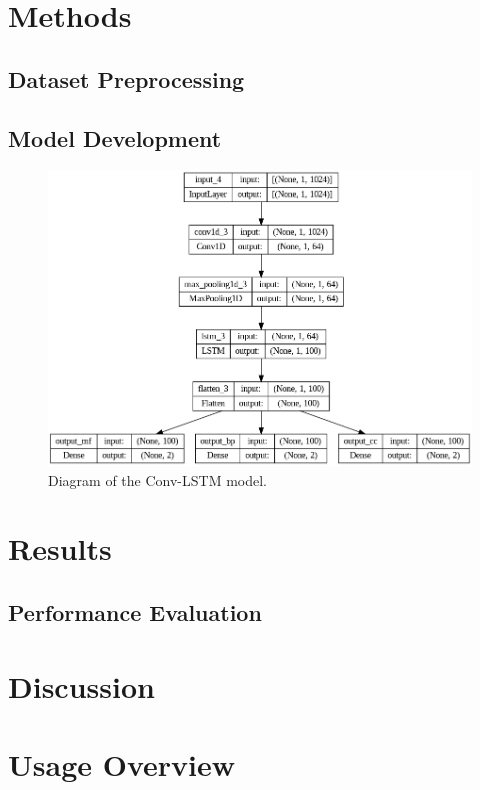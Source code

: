 \documentclass[10pt,twocolumn,letterpaper]{article}
\begin{document}
\section{Methods}

\subsection{Dataset Preprocessing}

\subsection{Model Development}

\begin{figure}[!h]
    \centering
    \includegraphics[scale=0.25]{img/model_diagram.png}
    \caption{Diagram of the Conv-LSTM model.}
    \label{fig:model_diagram}
\end{figure}

\section{Results}

\subsection{Performance Evaluation}

\section{Discussion}

\section{Usage Overview}
\end{document}

